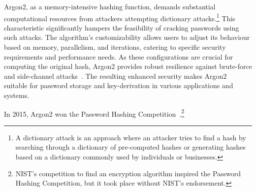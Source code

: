 Argon2, as a memory-intensive hashing function, demands substantial
computational resources from attackers attempting dictionary attacks.\footnote{
  A dictionary attack is an approach where an attacker tries to find a hash by
  searching through a dictionary of pre-computed hashes or generating hashes
  based on a dictionary commonly used by individuals or businesses.
}
This characteristic significantly hampers the feasibility of cracking passwords
using such attacks.
The algorithm's customizability allows users to adjust its behaviour based on
memory, parallelism, and iterations, catering to specific security requirements
and performance needs.
As these configurations are crucial for computing the original hash, Argon2
provides robust resilience against brute-force and side-channel attacks~\cite{
  argon2specs}.
The resulting enhanced security makes Argon2 suitable for password storage and
key-derivation in various applications and systems.

In 2015, Argon2 won the Password Hashing Competition~\cite{passwordhashing}.\footnote{
  NIST's competition to find an encryption algorithm inspired the Password
  Hashing Competition, but it took place without NIST's endorsement.
}

